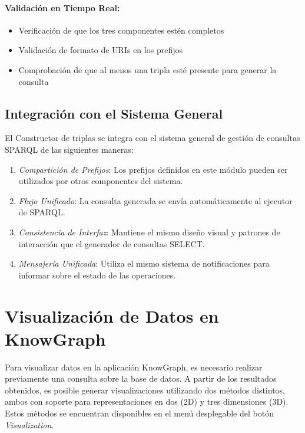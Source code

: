 \documentclass{article}
\begin{document}
\paragraph{Validación en Tiempo Real:}
\begin{itemize}
    \item Verificación de que los tres componentes estén completos
    \item Validación de formato de URIs en los prefijos
    \item Comprobación de que al menos una tripla esté presente para generar la consulta
\end{itemize}

\subsection{Integración con el Sistema General}
\label{subsec:triple-integration}

El Constructor de triplas se integra con el sistema general de gestión de consultas SPARQL de las siguientes maneras:

\begin{enumerate}
    \item \textit{Compartición de Prefijos}: Los prefijos definidos en este módulo pueden ser utilizados por otros componentes del sistema.
    \item \textit{Flujo Unificado}: La consulta generada se envía automáticamente al ejecutor de SPARQL.
    \item \textit{Consistencia de Interfaz}: Mantiene el mismo diseño visual y patrones de interacción que el generador de consultas SELECT.
    \item \textit{Mensajería Unificada}: Utiliza el mismo sistema de notificaciones para informar sobre el estado de las operaciones.
\end{enumerate}

\section{Visualización de Datos en KnowGraph}

Para visualizar datos en la aplicación KnowGraph, es necesario realizar previamente una consulta sobre la base de datos. A partir de los resultados obtenidos, es posible generar visualizaciones utilizando dos métodos distintos, ambos con soporte para representaciones en dos (2D) y tres dimensiones (3D). Estos métodos se encuentran disponibles en el menú desplegable del botón \textit{Visualization}.
\end{document}

